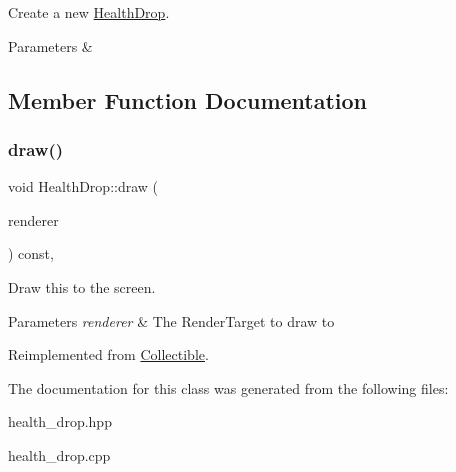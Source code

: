 Create a new \mbox{\hyperlink{class_health_drop}{Health\+Drop}}. 


\begin{DoxyParams}{Parameters}
{\em } & \\
\hline
\end{DoxyParams}


\subsection{Member Function Documentation}
\mbox{\label{class_health_drop_a6df6c3fb2e0509cd550420ed35a8fa12}} 
\subsubsection{\texorpdfstring{draw()}{draw()}}
{\footnotesize\ttfamily void Health\+Drop\+::draw (\begin{DoxyParamCaption}\item[{\mbox{\hyperlink{classsf_1_1_render_target}{sf\+::\+Render\+Target}} \&}]{renderer }\end{DoxyParamCaption}) const\hspace{0.3cm}{\ttfamily [override]}, {\ttfamily [virtual]}}



Draw this to the screen. 


\begin{DoxyParams}{Parameters}
{\em renderer} & The Render\+Target to draw to \\
\hline
\end{DoxyParams}


Reimplemented from \mbox{\hyperlink{class_collectible_a4bd92e0f368cd712b86e3ebabc3599f1}{Collectible}}.



The documentation for this class was generated from the following files\+:\begin{DoxyCompactItemize}
\item 
health\+\_\+drop.\+hpp\item 
health\+\_\+drop.\+cpp\end{DoxyCompactItemize}
